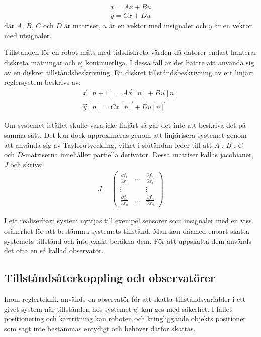 \documentclass[a4paper,12pt,fleqn]{article}
\begin{document}
\begin{gather}
\dot{x}=Ax+Bu \\
y=Cx+Du	
\label{equ:tillstand}
\end{gather}
där $A$, $B$, $C$ och $D$ är matriser, $u$ är en vektor med insignaler och $y$ är en vektor med utsignaler.

Tillstånden för en robot mäts med tidsdiskreta värden då datorer endast hanterar diskreta mätningar och ej kontinuerliga. I dessa fall är det bättre att använda sig av en diskret tillståndsbeskrivning. En diskret tillståndsbeskrivning av ett linjärt reglersystem beskrivs av: 
\begin{gather}
\vec{x}[n+1] = A\vec{x}[n] + B\vec{u}[n] \\
\vec{y}[n] = C\vec{x[n]} + D\vec{u[n]}
\end{gather}

Om systemet istället skulle vara icke-linjärt så går det inte att beskriva det på samma sätt. Det kan dock approximeras genom att linjärisera systemet genom att använda sig av Taylorutveckling, vilket i slutändan leder till att $A$-, $B$-, $C$- och $D$-matriserna innehåller partiella derivator. Dessa matriser kallas jacobianer, $J$ och skrivs:
\begin{gather}
	J= \begin{pmatrix}
	\frac{\partial f_1}{\partial x_1} & \dots & \frac{\partial f_n}{\partial x_1} \\
	  							\vdots &       & \vdots \\
	  \frac{\partial f_1}{\partial x_n} & \dots & \frac{\partial f_n}{\partial x_n}
	  \end{pmatrix}
\end{gather}



I ett realiserbart system nyttjas till exempel sensorer som insignaler med en viss osäkerhet för att bestämma systemets tillstånd. Man kan därmed enbart skatta systemets tillstånd och inte exakt beräkna dem. För att uppskatta dem används det ofta en så kallad observatör.

\subsection{Tillståndsåterkoppling och observatörer}

Inom reglerteknik används en observatör för att skatta tillståndsvariabler i ett givet system när tillstånden hos systemet ej kan ges med säkerhet. I fallet positionering och kartritning kan roboten och kringliggande objekts positioner som sagt inte bestämmas entydigt och behöver därför skattas. 
\end{document}
